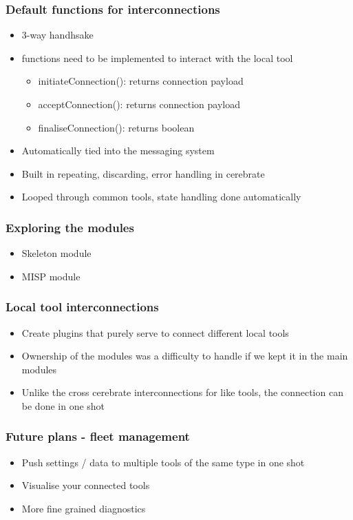 \begin{frame}
	\frametitle{Default functions for interconnections}
	\begin{itemize}
		\item 3-way handhsake
                \item functions need to be implemented to interact with the local tool
		\begin{itemize}
			\item initiateConnection(): returns connection payload
                        \item acceptConnection(): returns connection payload
                        \item finaliseConnection(): returns boolean
		\end{itemize}
		\item Automatically tied into the messaging system
                \item Built in repeating, discarding, error handling in cerebrate
                \item Looped through common tools, state handling done automatically
	\end{itemize}
\end{frame}

\begin{frame}
	\frametitle{Exploring the modules}
	\begin{itemize}
		\item Skeleton module
                \item MISP module
	\end{itemize}
\end{frame}


\begin{frame}
	\frametitle{Local tool interconnections}
	\begin{itemize}
		\item Create plugins that purely serve to connect different local tools
                \item Ownership of the modules was a difficulty to handle if we kept it in the main modules
                \item Unlike the cross cerebrate interconnections for like tools, the connection can be done in one shot
	\end{itemize}
\end{frame}

\begin{frame}
	\frametitle{Future plans - fleet management}
	\begin{itemize}
		\item Push settings / data to multiple tools of the same type in one shot
                \item Visualise your connected tools
                \item More fine grained diagnostics
	\end{itemize}
\end{frame}

